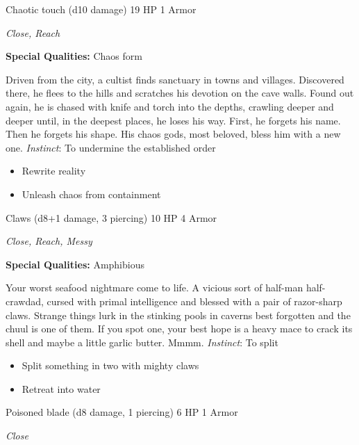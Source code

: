 \HRule
{}

Chaotic touch (d10 damage)\hspace*{\fill} 19 HP 1 Armor

\emph{Close, Reach}

\textbf{Special Qualities:}
Chaos form

\HRule
Driven from the city, a cultist finds sanctuary in towns and villages. Discovered there, he flees to the hills and scratches his devotion on the cave walls. Found out again, he is chased with knife and torch into the depths, crawling deeper and deeper until, in the deepest places, he loses his way. First, he forgets his name. Then he forgets his shape. His chaos gods, most beloved, bless him with a new one. \emph{Instinct}: To undermine the established order
\begin{itemize}
\item Rewrite reality
\item Unleash chaos from containment
\end{itemize}
\newpage
\HRule
{}

Claws (d8+1 damage, 3 piercing)\hspace*{\fill} 10 HP 4 Armor

\emph{Close, Reach, Messy}

\textbf{Special Qualities:}
Amphibious

\HRule
Your worst seafood nightmare come to life. A vicious sort of half-man half-crawdad, cursed with primal intelligence and blessed with a pair of razor-sharp claws. Strange things lurk in the stinking pools in caverns best forgotten and the chuul is one of them. If you spot one, your best hope is a heavy mace to crack its shell and maybe a little garlic butter. Mmmm. \emph{Instinct}: To split
\begin{itemize}
\item Split something in two with mighty claws
\item Retreat into water
\end{itemize}

\HRule
{}

Poisoned blade (d8 damage, 1 piercing)\hspace*{\fill} 6 HP 1 Armor

\emph{Close}


